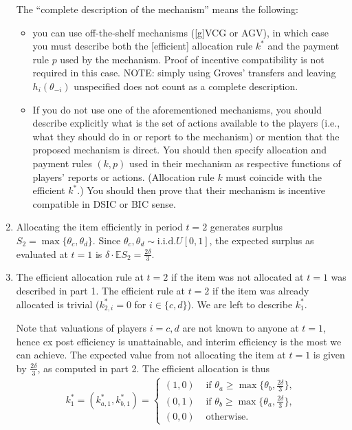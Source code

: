 \documentclass[a4paper]{article}
\begin{document}
\begin{enumerate}
		The ``complete description of the mechanism'' means the following:
		\begin{itemize}
			\item you can use off-the-shelf mechanisms ([g]VCG or AGV), in which case you must  describe both the [efficient] allocation rule $k^*$ and the payment rule $p$ used by the mechanism. Proof of incentive compatibility is not required in this case. NOTE: simply using Groves' transfers and leaving $h_i(\theta_{-i})$ unspecified does not count as a complete description.
			
			\item If you do not use one of the aforementioned mechanisms, you should describe explicitly what is the set of actions available to the players (i.e., what they should do in or report to the mechanism) or mention that the proposed mechanism is direct. You should then specify allocation and payment rules $(k,p)$ used in their mechanism as respective functions of players' reports or actions. (Allocation rule $k$ must coincide with the efficient $k^*$.) You should then prove that their mechanism is incentive compatible in DSIC or BIC sense.
		\end{itemize}
		
		\item Allocating the item efficiently in period $t=2$ generates surplus $S_2 = \max \{\theta_c,\theta_d\}$. Since $\theta_c,\theta_d \sim \text{i.i.d.}U[0,1]$, the expected surplus as evaluated at $t=1$ is $\delta \cdot \mathbb{E} S_2 = \frac{2\delta}{3}$. 
		
		\item The efficient allocation rule at $t=2$ if the item was not allocated at $t=1$ was described in part 1. The efficient rule at $t=2$ if the item was already allocated is trivial ($k^*_{2,i} = 0$ for $i \in \{c,d\}$). We are left to describe $k^*_1$.
		
		Note that valuations of players $i=c,d$ are not known to anyone at $t=1$, hence ex post efficiency is unattainable, and interim efficiency is the most we can achieve. The expected value from not allocating the item at $t=1$ is given by $\frac{2\delta}{3}$, as computed in part 2. The efficient allocation is thus
		\begin{align*}
			k^*_1 = (k^*_{a,1},k^*_{b,1}) = 
			\begin{cases}
				(1,0) & \text{ if } \theta_a \geq \max\{\theta_b, \frac{2\delta}{3}\},
				\\
				(0,1) & \text{ if } \theta_b \geq \max\{\theta_a, \frac{2\delta}{3}\},
				\\
				(0,0) & \text{ otherwise}.
			\end{cases}
		\end{align*}
		

\end{enumerate}
\end{document}
